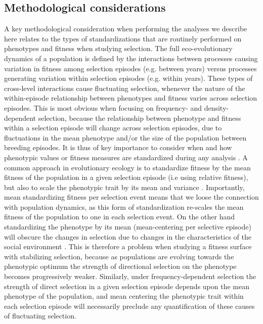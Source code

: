 \documentclass{article}
\begin{document}
\subsection{Methodological considerations}
 A key methodological consideration when performing the analyses we describe here relates to the types of standardizations that are routinely performed on phenotypes and fitness when studying selection. The full eco-evolutionary dynamics of a population is defined by the interactions between processes causing variation in fitness among selection episodes (e.g. between years) versus processes generating variation within selection episodes (e.g. within years). These types of cross-level interactions cause fluctuating selection, whenever the nature of the within-episode relationship between phenotypes and fitness varies across selection episodes. This is most obvious when focusing on frequency- and density-dependent selection, because the relationship between phenotype and fitness within a selection episode will change across selection episodes, due to fluctuations in the mean phenotype and/or the size of the population between breeding episodes. It is thus of key importance to consider when and how phenotypic values or fitness measures are standardized during any analysis \citep{DeLisle2017}. A common approach in evolutionary ecology is to standardize fitness by the mean fitness of the population in a given selection episode (i.e using relative fitness), but also to scale the phenotypic trait by its mean and variance \citep{Dingemanse2021}. Importantly, mean standardizing fitness per selection event means that we loose the connection with population dynamics, as this form of standardization re-scales the mean fitness of the population to one in each selection event. On the other hand standardizing the phenotype by its mean (mean-centering per selective episode) will obscure the changes in selection due to changes in the characteristics of the social environment \citep{Araya-Ajoy2020}. This is therefore a problem when studying a fitness surface with stabilizing selection, because as populations are evolving towards the phenotypic optimum the strength of directional selection on the phenotype becomes progressively weaker. Similarly, under frequency-dependent selection the strength of direct selection in a given selection episode depends upon the mean phenotype of the population, and mean centering the phenotypic trait within each selection episode will necessarily preclude any quantification of these causes of fluctuating selection. 
\end{document}
